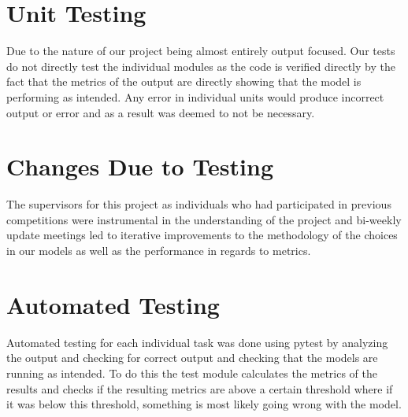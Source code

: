 \documentclass[12pt, titlepage]{article}
\begin{document}
\section{Unit Testing}

Due to the nature of our project being almost entirely output focused. Our
tests do not directly test the individual modules as the code is verified directly by the
fact that the metrics of the output are directly showing that the model is
performing as intended. Any error in individual units would produce incorrect output or error and as a result was deemed to not be necessary. 

\section{Changes Due to Testing}

The supervisors for this project as individuals who had participated in previous competitions were instrumental in the understanding of the project and bi-weekly update meetings led to iterative improvements to the methodology of the choices in our models as well as the performance in regards to metrics.

\section{Automated Testing}

Automated testing for each individual task was done using pytest by analyzing the output and checking for correct output and checking that the models are running as intended. To do this the test module calculates the metrics of the results and checks if the resulting metrics are above a certain threshold where if it was below this threshold, something is most likely going wrong with the model.
\end{document}

